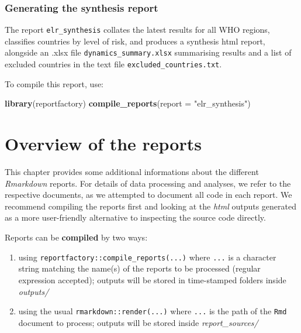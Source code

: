 \documentclass[]{book}
\newenvironment{Shaded}{\begin{snugshade}}{\end{snugshade}}
\newcommand{\DataTypeTok}[1]{\textcolor[rgb]{0.13,0.29,0.53}{#1}}
\newcommand{\KeywordTok}[1]{\textcolor[rgb]{0.13,0.29,0.53}{\textbf{#1}}}
\newcommand{\NormalTok}[1]{#1}
\newcommand{\StringTok}[1]{\textcolor[rgb]{0.31,0.60,0.02}{#1}}
\begin{document}
\hypertarget{generating-the-synthesis-report}{%
\subsection{Generating the synthesis report}\label{generating-the-synthesis-report}}

The report \texttt{elr\_synthesis} collates the latest results for all WHO regions,
classifies countries by level of risk, and produces a synthesis html report,
alongside an .xlsx file \texttt{dynamics\_summary.xlsx} summarising results and a list
of excluded countries in the text file \texttt{excluded\_countries.txt}.

To compile this report, use:

\begin{Shaded}
\begin{Highlighting}[]

\KeywordTok{library}\NormalTok{(reportfactory)}
\KeywordTok{compile_reports}\NormalTok{(}\DataTypeTok{report =} \StringTok{"elr_synthesis"}\NormalTok{)}
\end{Highlighting}
\end{Shaded}

\hypertarget{reports}{%
\chapter{Overview of the reports}\label{reports}}

This chapter provides some additional informations about the different
\emph{Rmarkdown} reports. For details of data processing and analyses, we refer to
the respective documents, as we attempted to document all code in each
report. We recommend compiling the reports first and looking at the \emph{html}
outputs generated as a more user-friendly alternative to inspecting the source
code directly.

Reports can be \textbf{compiled} by two ways:

\begin{enumerate}
\def\labelenumi{\arabic{enumi}.}
\item
  using \texttt{reportfactory::compile\_reports(...)} where \texttt{...} is a character string
  matching the name(s) of the reports to be processed (regular expression
  accepted); outputs will be stored in time-stamped folders inside \emph{outputs/}
\item
  using the usual \texttt{rmarkdown::render(...)} where \texttt{...} is the path of the \texttt{Rmd}
  document to process; outputs will be stored inside \emph{report\_sources/}
\end{enumerate}
\end{document}
